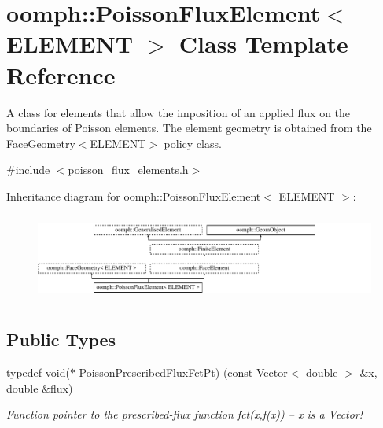 \hypertarget{classoomph_1_1PoissonFluxElement}{}\section{oomph\+:\+:Poisson\+Flux\+Element$<$ E\+L\+E\+M\+E\+NT $>$ Class Template Reference}
\label{classoomph_1_1PoissonFluxElement}


A class for elements that allow the imposition of an applied flux on the boundaries of Poisson elements. The element geometry is obtained from the Face\+Geometry$<$\+E\+L\+E\+M\+E\+N\+T$>$ policy class.  




{\ttfamily \#include $<$poisson\+\_\+flux\+\_\+elements.\+h$>$}

Inheritance diagram for oomph\+:\+:Poisson\+Flux\+Element$<$ E\+L\+E\+M\+E\+NT $>$\+:\begin{figure}[H]
\begin{center}
\leavevmode
\includegraphics[height=2.905318cm]{classoomph_1_1PoissonFluxElement}
\end{center}
\end{figure}
\subsection*{Public Types}
\begin{DoxyCompactItemize}
\item 
typedef void($\ast$ \hyperlink{classoomph_1_1PoissonFluxElement_a667254e1d7fea39ba393e0d9853f216d}{Poisson\+Prescribed\+Flux\+Fct\+Pt}) (const \hyperlink{classoomph_1_1Vector}{Vector}$<$ double $>$ \&x, double \&flux)
\begin{DoxyCompactList}\small\item\em Function pointer to the prescribed-\/flux function fct(x,f(x)) -- x is a Vector! \end{DoxyCompactList}\end{DoxyCompactItemize}

